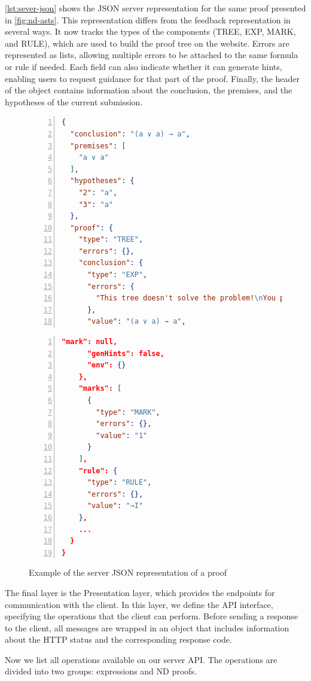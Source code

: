 \autoref{lst:sever-json} shows the JSON server representation for the same proof presented in \autoref{fig:nd-asts}. This representation differs from the feedback representation in several ways. It now tracks the types of the components (TREE, EXP, MARK, and RULE), which are used to build the proof tree on the website. Errors are represented as lists, allowing multiple errors to be attached to the same formula or rule if needed. Each field can also indicate whether it can generate hints, enabling users to request guidance for that part of the proof. Finally, the header of the object contains information about the conclusion, the premises, and the hypotheses of the current submission.

\begin{figure}[H]
\centering
\begin{minipage}{0.48\textwidth}
\begin{lstlisting}[language=json,
numbers=left]
{
  "conclusion": "(a ∨ a) → a",
  "premises": [
    "a ∨ a"
  ],
  "hypotheses": {
    "2": "a",
    "3": "a"
  },
  "proof": {
    "type": "TREE",
    "errors": {},
    "conclusion": {
      "type": "EXP",
      "errors": {
        "This tree doesn't solve the problem!\nYou proved:\n{a ∨ a} ⊢ (a ∨ a) → a"
      },
      "value": "(a ∨ a) → a",
\end{lstlisting}
\end{minipage}%
\hfill
\begin{minipage}{0.48\textwidth}
\begin{lstlisting}[language=json,
numbers=left,
firstnumber=last]
      "mark": null,
      "genHints": false,
      "env": {}
    },
    "marks": [
      {
        "type": "MARK",
        "errors": {},
        "value": "1"
      }
    ],
    "rule": {
      "type": "RULE",
      "errors": {},
      "value": "→I"
    },
    ...
  }
}
\end{lstlisting}
\end{minipage}
\caption{Example of the server JSON representation of a proof}
\label{lst:sever-json}
\end{figure}

The final layer is the Presentation layer, which provides the endpoints for communication with the client. In this layer, we define the API interface, specifying the operations that the client can perform. Before sending a response to the client, all messages are wrapped in an object that includes information about the HTTP status and the corresponding response code.

Now we list all operations available on our server API. The operations are divided into two groups: expressions and \gls{ND} proofs.

